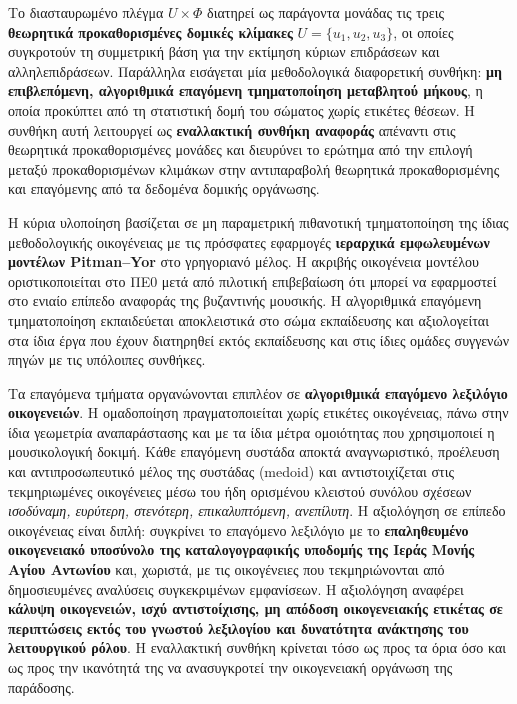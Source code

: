 \documentclass[11pt,a4paper]{article}
\begin{document}
Το διασταυρωμένο πλέγμα \(U\times\Phi\) διατηρεί ως παράγοντα μονάδας τις τρεις \textbf{θεωρητικά προκαθορισμένες δομικές κλίμακες} \(U=\{u_1,u_2,u_3\}\), οι οποίες συγκροτούν τη συμμετρική βάση για την εκτίμηση κύριων επιδράσεων και αλληλεπιδράσεων. Παράλληλα εισάγεται μία μεθοδολογικά διαφορετική συνθήκη: \textbf{μη επιβλεπόμενη, αλγοριθμικά επαγόμενη τμηματοποίηση μεταβλητού μήκους}, η οποία προκύπτει από τη στατιστική δομή του σώματος χωρίς ετικέτες θέσεων. Η συνθήκη αυτή λειτουργεί ως \textbf{εναλλακτική συνθήκη αναφοράς} απέναντι στις θεωρητικά προκαθορισμένες μονάδες και διευρύνει το ερώτημα από την επιλογή μεταξύ προκαθορισμένων κλιμάκων στην αντιπαραβολή θεωρητικά προκαθορισμένης και επαγόμενης από τα δεδομένα δομικής οργάνωσης.

Η κύρια υλοποίηση βασίζεται σε μη παραμετρική πιθανοτική τμηματοποίηση της ίδιας μεθοδολογικής οικογένειας με τις πρόσφατες εφαρμογές \textbf{ιεραρχικά εμφωλευμένων μοντέλων Pitman--Yor} στο γρηγοριανό μέλος. Η ακριβής οικογένεια μοντέλου οριστικοποιείται στο ΠΕ0 μετά από πιλοτική επιβεβαίωση ότι μπορεί να εφαρμοστεί στο ενιαίο επίπεδο αναφοράς της βυζαντινής μουσικής. Η αλγοριθμικά επαγόμενη τμηματοποίηση εκπαιδεύεται αποκλειστικά στο σώμα εκπαίδευσης και αξιολογείται στα ίδια έργα που έχουν διατηρηθεί εκτός εκπαίδευσης και στις ίδιες ομάδες συγγενών πηγών με τις υπόλοιπες συνθήκες.

Τα επαγόμενα τμήματα οργανώνονται επιπλέον σε \textbf{αλγοριθμικά επαγόμενο λεξιλόγιο οικογενειών}. Η ομαδοποίηση πραγματοποιείται χωρίς ετικέτες οικογένειας, πάνω στην ίδια γεωμετρία αναπαράστασης και με τα ίδια μέτρα ομοιότητας που χρησιμοποιεί η μουσικολογική δοκιμή. Κάθε επαγόμενη συστάδα αποκτά αναγνωριστικό, προέλευση και αντιπροσωπευτικό μέλος της συστάδας (medoid) και αντιστοιχίζεται στις τεκμηριωμένες οικογένειες μέσω του ήδη ορισμένου κλειστού συνόλου σχέσεων \emph{ισοδύναμη, ευρύτερη, στενότερη, επικαλυπτόμενη, ανεπίλυτη}. Η αξιολόγηση σε επίπεδο οικογένειας είναι διπλή: συγκρίνει το επαγόμενο λεξιλόγιο με το \textbf{επαληθευμένο οικογενειακό υποσύνολο της καταλογογραφικής υποδομής της Ιεράς Μονής Αγίου Αντωνίου} και, χωριστά, με τις οικογένειες που τεκμηριώνονται από δημοσιευμένες αναλύσεις συγκεκριμένων εμφανίσεων. Η αξιολόγηση αναφέρει \textbf{κάλυψη οικογενειών, ισχύ αντιστοίχισης, μη απόδοση οικογενειακής ετικέτας σε περιπτώσεις εκτός του γνωστού λεξιλογίου και δυνατότητα ανάκτησης του λειτουργικού ρόλου}. Η εναλλακτική συνθήκη κρίνεται τόσο ως προς τα όρια όσο και ως προς την ικανότητά της να ανασυγκροτεί την οικογενειακή οργάνωση της παράδοσης.
\end{document}
